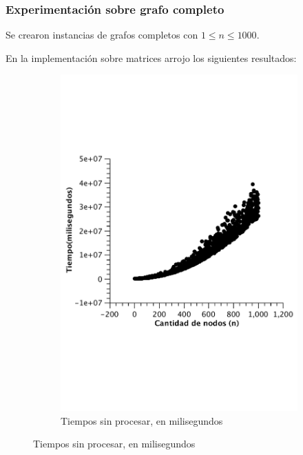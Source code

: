 \subsubsection{Experimentación sobre grafo completo}

Se crearon instancias de grafos completos con $1 \leq n \leq 1000$.

En la implementación sobre matrices arrojo los siguientes resultados:\\ 

\begin{figure}[H]
        \centering
\begin{subfigure}[b]{0.5\textwidth}
                \includegraphics[width=\textwidth]{imagenes/completo-matriz-1.pdf}
                \caption{Tiempos sin procesar, en milisegundos}
        \end{subfigure}%


\end{figure}
